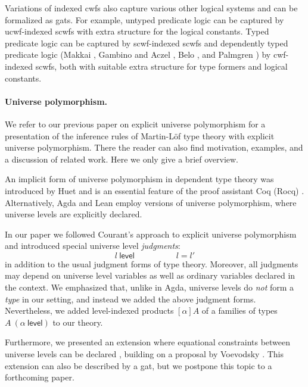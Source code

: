 \documentclass[11pt,a4paper]{article}
\theoremstyle{plain}
\theoremstyle{definition}
\newcommand{\level}{\mathsf{level}}
\def\Sigmaext{{\Sigma^\mathrm{ext}}}
\def\Sigmaint{{\Sigma^\mathrm{up}}}
\def\TText{{\mathbf{TT}^\mathrm{ext}}}
\def\TTint{{\mathbf{TT}^\mathrm{up}}}
\begin{document}

Variations of indexed cwfs also capture various other logical systems and can be formalized as gats. For example, untyped predicate logic can be captured by ucwf-indexed scwfs with extra structure for the logical constants. Typed predicate logic can be captured by scwf-indexed scwfs and dependently typed predicate logic (Makkai \cite{makkai:folds}, Gambino and Aczel \cite{gambino-aczel}, Belo \cite{belo}, and Palmgren \cite{Palmgren19}) by cwf-indexed scwfs, both with suitable extra structure for type formers and logical constants. 
\paragraph{Universe polymorphism.} We refer to our previous paper on explicit universe polymorphism \cite{BezemCDE22} for a presentation of the inference rules of Martin-Löf type theory with explicit universe polymorphism. There the reader can also find motivation, examples, and a discussion of related work. Here we only give a brief overview. 

An implicit form of universe polymorphism in dependent type theory was introduced by Huet \cite{Huet87} and is an essential feature of the proof assistant Coq (Rocq) \cite{coq:general}. Alternatively, Agda \cite{agda-wiki} and Lean \cite{moura:lean} employ versions of universe polymorphism, where universe levels are explicitly declared. 

In our paper we followed Courant's approach \cite{Courant02} to explicit universe polymorphism and introduced special universe level {\em judgments}:
$$
l\ \level
\hspace{5em}
l = l'
$$
in addition to the usual judgment forms of type theory. Moreover, all judgments may depend on universe level variables as well as ordinary variables declared in the context. We emphasized that, unlike in Agda, universe levels do {\em not} form a {\em type} in our setting, and instead we added the above judgment forms. Nevertheless, we added level-indexed products $[\alpha]A$ of a families of types $A\ (\alpha\ \level)$ to our theory.

Furthermore, we presented an extension where equational constraints between universe levels can be declared \cite{BezemCDE22}, building on a proposal by Voevodsky \cite{VV}. This extension can also be described by a gat, but we postpone this topic to a forthcoming paper.
\end{document}
